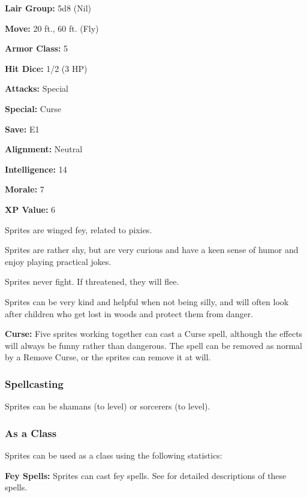 \begin{multicols*}{2}
{\textbf{Lair Group:} 5d8 (Nil)

\textbf{Move:} 20 ft., 60 ft. (Fly)

\textbf{Armor Class:} 5

\textbf{Hit Dice:} 1/2 (3 HP)

\textbf{Attacks:} Special

\textbf{Special:} Curse

\textbf{Save:} E1

\textbf{Alignment:} Neutral

\textbf{Intelligence:} 14

\textbf{Morale:} 7

\textbf{XP Value:} 6}

Sprites are winged fey, related to pixies.

Sprites are rather shy, but are very curious and have a keen sense of humor and enjoy playing practical jokes.

Sprites never fight. If threatened, they will flee.

Sprites can be very kind and helpful when not being silly, and will often look after children who get lost in woods and protect them from danger.

\textbf{Curse:} Five sprites working together can cast a Curse spell, although the effects will always be funny rather than dangerous. The spell can be removed as normal by a Remove Curse, or the sprites can remove it at will.

\subsubsection{Spellcasting}
Sprites can be shamans (to  level) or sorcerers (to  level).

\subsubsection{As a Class}
Sprites can be used as a class using the following statistics:

\textbf{Fey Spells:} Sprites can cast fey spells. See  for detailed descriptions of these spells.

\end{multicols*}

